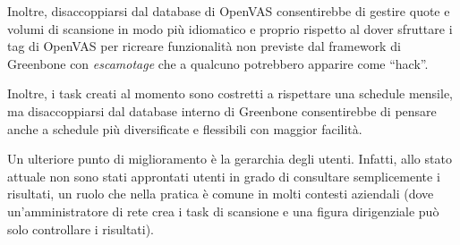 Inoltre, disaccoppiarsi dal database di OpenVAS consentirebbe di gestire quote e volumi di scansione in modo più idiomatico e proprio rispetto al dover sfruttare i tag di OpenVAS per ricreare funzionalità non previste dal framework di Greenbone con \emph{escamotage} che a qualcuno potrebbero apparire come ``hack''.

Inoltre, i task creati al momento sono costretti a rispettare una schedule mensile, ma disaccoppiarsi dal database interno di Greenbone consentirebbe di pensare anche a schedule più diversificate e flessibili con maggior facilità.

Un ulteriore punto di miglioramento è la gerarchia degli utenti. Infatti, allo stato attuale non sono stati approntati utenti in grado di consultare semplicemente i risultati, un ruolo che nella pratica è comune in molti contesti aziendali (dove un'amministratore di rete crea i task di scansione e una figura dirigenziale può solo controllare i risultati).